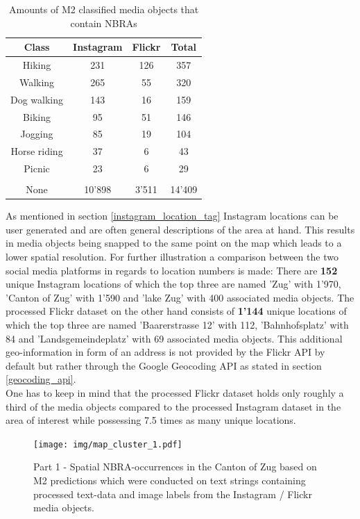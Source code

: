 \begin{table}[h!]
\begin{center}
\caption{Amounts of M2 classified media objects that contain NBRAs}\vspace{1ex}
\label{tab:amount_class_NBRAs}
\begin{tabular}{cccc}\hline
Class & Instagram & Flickr & Total\\ \hline
Hiking & 231 & 126 & 357\\
Walking & 265 & 55 & 320\\
Dog walking & 143 & 16 & 159\\
Biking & 95 & 51 & 146\\
Jogging & 85 & 19 & 104\\
Horse riding & 37 & 6 & 43\\
Picnic & 23 & 6 & 29\\
 & & & \\
None & 10'898 & 3'511 & 14'409\\
\hline
\end{tabular}
\end{center}
\end{table}

As mentioned in section \ref{instagram_location_tag} Instagram locations can be user generated and are often general descriptions of the area at hand. This results in media objects being snapped to the same point on the map which leads to a lower spatial resolution. For further illustration a comparison between the two social media platforms in regards to location numbers is made:
There are \textbf{152} unique Instagram locations of which the top three are named 'Zug' with 1'970, 'Canton of Zug' with 1'590 and 'lake Zug' with 400 associated media objects.
The processed Flickr dataset on the other hand consists of \textbf{1'144} unique locations of which the top three are named 'Baarerstrasse 12' with 112, 'Bahnhofsplatz' with 84 and 'Landsgemeindeplatz' with 69 associated media objects. This additional geo-information in form of an address is not provided by the Flickr API by default but rather through the Google Geocoding API as stated in section \ref{geocoding_api}. \\
One has to keep in mind that the processed Flickr dataset holds only roughly a third of the media objects compared to the processed Instagram dataset in the area of interest while possessing 7.5 times as many unique locations. 

\begin{figure}[h!]
   \centering
   \texttt{[image: img/map\_cluster\_1.pdf]}
   \caption{Part 1 - Spatial NBRA-occurrences in the Canton of Zug based on M2 predictions which were conducted on text strings containing processed text-data and image labels from the Instagram / Flickr media objects.}
   \label{fig:map_cluster_1}
\end{figure}

